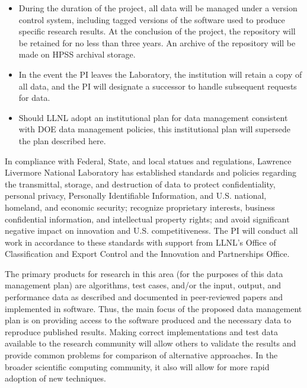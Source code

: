 \documentclass[11pt]{article}
\begin{document}
\begin{itemize}
\item During the duration of the project, all data will be managed under a
  version control system, including tagged versions of the software used to
  produce specific research results. At the conclusion of the project, the
  repository will be retained for no less than three years. An archive of the
  repository will be made on HPSS archival storage.
\item In the event the PI leaves the Laboratory, the institution will retain a
  copy of all data, and the PI will designate a successor to handle subsequent
  requests for data.
\item Should LLNL adopt an institutional plan for data management consistent
  with DOE data management policies, this institutional plan will supersede the
  plan described here.
\end{itemize}

In compliance with Federal, State, and local statues and regulations, Lawrence
Livermore National Laboratory has established standards and policies regarding
the transmittal, storage, and destruction of data to protect confidentiality,
personal privacy, Personally Identifiable Information, and U.S. national,
homeland, and economic security; recognize proprietary interests, business
confidential information, and intellectual property rights; and avoid
significant negative impact on innovation and U.S. competitiveness. The PI will
conduct all work in accordance to these standards with support from LLNL's
Office of Classification and Export Control and the Innovation and Partnerships
Office.

\medskip

The primary products for research in this area (for the purposes of this data
management plan) are algorithms, test cases, and/or the input, output, and
performance data as described and documented in peer-reviewed papers and
implemented in software. Thus, the main focus of the proposed data management
plan is on providing access to the software produced and the necessary data to
reproduce published results. Making correct implementations and test data
available to the research community will allow others to validate the results
and provide common problems for comparison of alternative approaches. In the
broader scientific computing community, it also will allow for more rapid
adoption of new techniques.

\newpage
\end{document}
